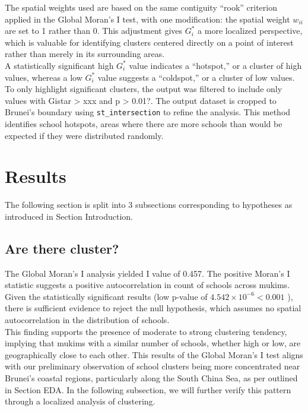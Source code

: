 \documentclass[12pt]{article}
\begin{document}
The spatial weights used are based on the same contiguity “rook” criterion applied in the Global Moran’s I test, with one modification: the spatial weight \( w_{ii} \) are set to 1 rather than 0. This adjustment gives \( G_i^* \) a more localized perspective, which is valuable for identifying clusters centered directly on a point of interest rather than merely in its surrounding areas. \\

A statistically significant high \( G_i^* \) value indicates a “hotspot,” or a cluster of high values, whereas a low \( G_i^* \) value suggests a “coldspot,” or a cluster of low values. \\

To only highlight significant clusters, the output was filtered to include only values with Gistar > xxx and p > 0.01?. The output dataset is cropped to Brunei’s boundary using \texttt{st\_intersection} to refine the analysis. This method identifies school hotspots, areas where there are more schools than would be expected if they were distributed randomly. \\



\section{Results}
The following section is split into 3 subsections corresponding to hypotheses as introduced in Section Introduction.

\subsection{Are there cluster?}
The Global Moran's I analysis yielded I value of 0.457. The positive Moran’s I statistic suggests a positive autocorrelation in count of schools across mukims. Given the statistically significant results (low p-value of $4.542 \times 10^{-6} < 0.001$ ), there is sufficient evidence to reject the null hypothesis, which assumes no spatial autocorrelation in the distribution of schools. \\

This finding supports the presence of moderate to strong clustering tendency, implying that mukims with a similar number of schools, whether high or low, are geographically close to each other. This results of the Global Moran’s I test aligns with our preliminary observation of school clusters being more concentrated near Brunei’s coastal regions, particularly along the South China Sea, as per outlined in Section EDA. In the following subsection, we will further verify this pattern through a localized analysis of clustering. \\
\end{document}
